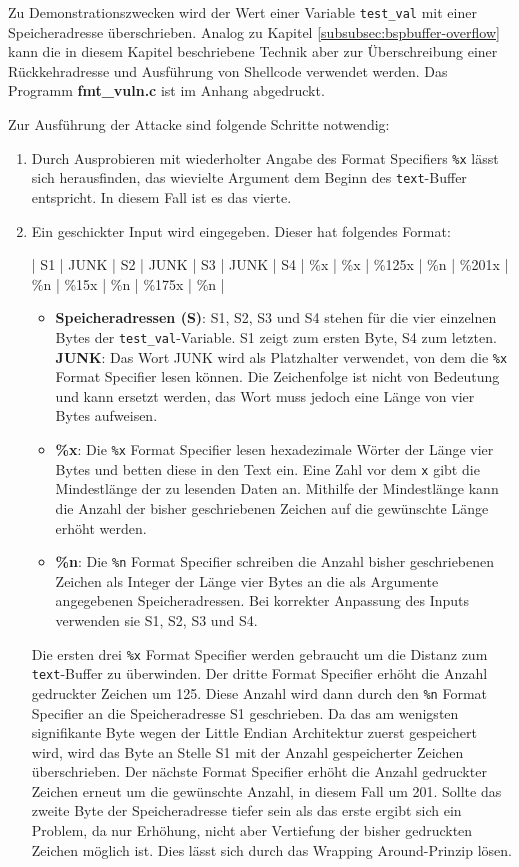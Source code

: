 \documentclass[11pt, a4paper]{article}
\begin{document}
Zu Demonstrationszwecken wird der Wert einer Variable \texttt{test\_val} mit einer Speicheradresse überschrieben. Analog zu Kapitel \ref{subsubsec:bspbuffer-overflow} kann die in diesem Kapitel beschriebene Technik aber zur Überschreibung einer Rückkehradresse und Ausführung von Shellcode verwendet werden. Das Programm \textbf{fmt\_vuln.c} ist im Anhang abgedruckt. 

Zur Ausführung der Attacke sind folgende Schritte notwendig:
\begin{enumerate}
	\item Durch Ausprobieren mit wiederholter Angabe des Format Specifiers \texttt{\%x} lässt sich herausfinden, das wievielte Argument dem Beginn des \texttt{text}-Buffer entspricht. In diesem Fall ist es das vierte. 
	\item Ein geschickter Input wird eingegeben. Dieser hat folgendes Format:
	\newline
	\begin{center}
		\centerline{| S1 | JUNK | S2 | JUNK | S3 | JUNK | S4 | \%x | \%x | \%125x | \%n | \%201x | \%n | \%15x | \%n | \%175x | \%n |}
	\end{center}
	\begin{itemize}
		\item \textbf{Speicheradressen (S)}: S1, S2, S3 und S4 stehen für die vier einzelnen Bytes der \texttt{test\_val}-Variable. S1 zeigt zum ersten Byte, S4 zum letzten.
		\textbf{JUNK}: Das Wort JUNK wird als Platzhalter verwendet, von dem die \texttt{\%x} Format Specifier lesen können. Die Zeichenfolge ist nicht von Bedeutung und kann ersetzt werden, das Wort muss jedoch eine Länge von vier Bytes aufweisen.
		\item \textbf{\%x}: Die \texttt{\%x} Format Specifier lesen hexadezimale Wörter der Länge vier Bytes und betten diese in den Text ein. Eine Zahl vor dem \texttt{x} gibt die Mindestlänge der zu lesenden Daten an. Mithilfe der Mindestlänge kann die Anzahl der bisher geschriebenen Zeichen auf die gewünschte Länge erhöht werden.
		\item \textbf{\%n}: Die \texttt{\%n} Format Specifier schreiben die Anzahl bisher geschriebenen Zeichen als Integer der Länge vier Bytes an die als Argumente angegebenen Speicheradressen. Bei korrekter Anpassung des Inputs verwenden sie S1, S2, S3 und S4. 
	\end{itemize}
	Die ersten drei \texttt{\%x} Format Specifier werden gebraucht um die Distanz zum \texttt{text}-Buffer zu überwinden. Der dritte Format Specifier erhöht die Anzahl gedruckter Zeichen um 125. Diese Anzahl wird dann durch den \texttt{\%n} Format Specifier an die Speicheradresse S1 geschrieben. Da das am wenigsten signifikante Byte wegen der Little Endian Architektur zuerst gespeichert wird, wird das Byte an Stelle S1 mit der Anzahl gespeicherter Zeichen überschrieben. Der nächste Format Specifier erhöht die Anzahl gedruckter Zeichen erneut um die gewünschte Anzahl, in diesem Fall um 201. Sollte das zweite Byte der Speicheradresse tiefer sein als das erste ergibt sich ein Problem, da nur Erhöhung, nicht aber Vertiefung der bisher gedruckten Zeichen möglich ist. Dies lässt sich durch das Wrapping Around-Prinzip lösen. 

\end{enumerate}
\end{document}
